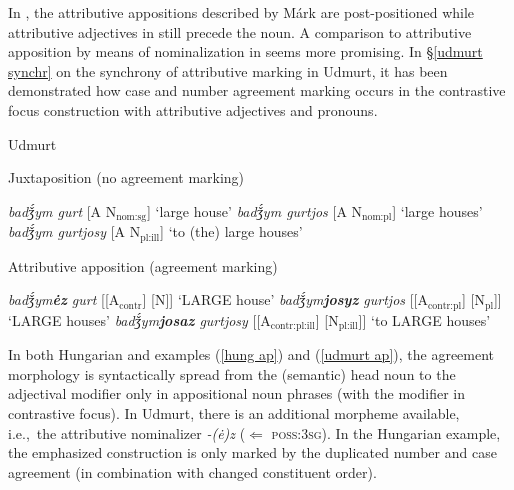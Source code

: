 {In , the attributive appositions described by Márk are post\hyp{}positioned while attributive adjectives in  still precede the noun. A comparison to attributive apposition by means of nominalization in  seems more promising. In \S\ref{udmurt synchr} on the synchrony of attributive marking in Udmurt, it has been demonstrated how case and number agreement marking occurs in the contrastive focus construction with attributive adjectives and pronouns.
\begin{exe} \label{udmurt ap}
\ex \rm{Udmurt \citep{winkler2001}}
\begin{xlist}
\ex 	\rm{Juxtaposition (no agreement marking)}
\begin{xlist}
\ex	\textit{badǯ́ym gurt} 				\rm{[A N$_{\text{nom:sg}}$] ‘large house’}
\ex	\textit{badǯ́ym gurtjos} 			\rm{[A N$_{\text{nom:pl}}$] ‘large houses’}
\ex	\textit{badǯ́ym gurtjosy} 			\rm{[A N$_{\text{pl:ill}}$] ‘to (the) large houses’}
\end{xlist}
\ex	\rm{Attributive apposition (agreement marking)}
\begin{xlist}
\ex	\textit{badǯ́ym\textbf{ėz} gurt} 		\rm{[[A$_{\text{contr}}$] [N]] ‘LARGE house’}
\ex	\textit{badǯ́ym\textbf{josyz} gurtjos} 	\rm{[[A$_{\text{contr:pl}}$] [N$_{\text{pl}}$]] ‘LARGE houses’}
\ex	\textit{badǯ́ym\textbf{josaz} gurtjosy} 	\rm{[[A$_{\text{contr:pl:ill}}$] [N$_{\text{pl:ill}}$]] ‘to LARGE houses’}
\end{xlist}
\end{xlist}
\end{exe}
In both Hungarian and  examples (\ref{hung ap}) and (\ref{udmurt ap}), the agreement morphology is syntactically spread from the (semantic) head noun to the adjectival modifier only in appositional noun phrases (with the modifier in contrastive focus). In Udmurt, there is an additional morpheme available, i.e.,~the attributive nominalizer \textit{-(ė)z} ($\Leftarrow$ \textsc{poss:3sg}). In the Hungarian example, the emphasized construction is only marked by the duplicated number and case agreement (in combination with changed constituent order).

}
